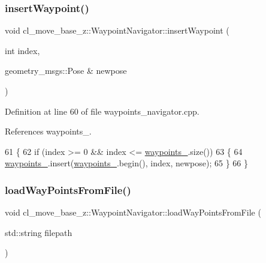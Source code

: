 \subsubsection{\texorpdfstring{insert\+Waypoint()}{insertWaypoint()}}
{\footnotesize\ttfamily void cl\+\_\+move\+\_\+base\+\_\+z\+::\+Waypoint\+Navigator\+::insert\+Waypoint (\begin{DoxyParamCaption}\item[{int}]{index,  }\item[{geometry\+\_\+msgs\+::\+Pose \&}]{newpose }\end{DoxyParamCaption})}



Definition at line 60 of file waypoints\+\_\+navigator.\+cpp.



References waypoints\+\_\+.


\begin{DoxyCode}
61 \{
62   \textcolor{keywordflow}{if} (index >= 0 && index <= \hyperlink{classcl__move__base__z_1_1WaypointNavigator_a727f6a73e15ff5dc6bb3ffdf52c3d832}{waypoints\_}.size())
63   \{
64     \hyperlink{classcl__move__base__z_1_1WaypointNavigator_a727f6a73e15ff5dc6bb3ffdf52c3d832}{waypoints\_}.insert(\hyperlink{classcl__move__base__z_1_1WaypointNavigator_a727f6a73e15ff5dc6bb3ffdf52c3d832}{waypoints\_}.begin(), index, newpose);
65   \}
66 \}
\end{DoxyCode}
\mbox{\label{classcl__move__base__z_1_1WaypointNavigator_a18d74467ddf0e637a8d5a6e1fa2e93db}} 
\subsubsection{\texorpdfstring{load\+Way\+Points\+From\+File()}{loadWayPointsFromFile()}}
{\footnotesize\ttfamily void cl\+\_\+move\+\_\+base\+\_\+z\+::\+Waypoint\+Navigator\+::load\+Way\+Points\+From\+File (\begin{DoxyParamCaption}\item[{std\+::string}]{filepath }\end{DoxyParamCaption})}



